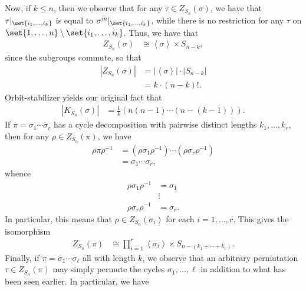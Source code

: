 \documentclass[10pt]{mypackage}
\begin{document}
Now, if $k\leq n$, then we observe that for any $\tau\in Z_{S_n}\left( \sigma \right)$, we have that $\tau|_{\set{i_1,\dots,i_k}}$ is equal to $\sigma^{m}|_{\set{i_1,\dots,i_k}}$, while there is no restriction for any $\tau$ on $\set{1,\dots,n}\setminus \set{i_1,\dots,i_k}$. Thus, we have that
\begin{align*}
  Z_{S_n}\left( \sigma \right) &\cong \left\langle \sigma \right\rangle\times S_{n-k},
\end{align*}
since the subgroups commute, so that
\begin{align*}
  \left\vert Z_{S_n}\left( \sigma \right) \right\vert &= \left\vert \left\langle \sigma \right\rangle \right\vert\cdot \left\vert S_{n-k} \right\vert\\
                                                      &= k\cdot \left( n-k \right)!.
\end{align*}
Orbit-stabilizer yields our original fact that
\begin{align*}
  \left\vert K_{S_n}\left( \sigma \right) \right\vert &= \frac{1}{k}\left( n\left( n-1 \right)\cdots \left( n-\left( k-1 \right) \right) \right).
\end{align*}
If $\pi = \sigma_1\cdots \sigma_r$ has a cycle decomposition with pairwise distinct lengths $k_1,\dots,k_r$, then for any $\rho \in Z_{S_n}\left( \pi \right)$, we have
\begin{align*}
  \rho \pi \rho^{-1} &= \left( \rho \sigma_1\rho^{-1} \right) \cdots \left( \rho\sigma_r\rho^{-1} \right)\\
                     &= \sigma_1\cdots \sigma_r,
\end{align*}
whence
\begin{align*}
  \rho\sigma_1\rho^{-1} &= \sigma_1\\
                        &\vdots\\
  \rho\sigma_r\rho^{-1} &= \sigma_r.
\end{align*}
In particular, this means that $\rho\in Z_{S_n}\left( \sigma_i \right)$ for each $i=1,\dots,r$. This gives the isomorphism
\begin{align*}
  Z_{S_n}\left( \pi \right) &\cong \prod_{i=1}^{r} \left\langle \sigma_i \right\rangle\times S_{n-\left( k_1+\cdots+k_r \right)}.
\end{align*}
Finally, if $\pi = \sigma_1\cdots \sigma_\ell$ all with length $k$, we observe that an arbitrary permutation $\tau\in Z_{S_n}\left( \pi \right)$ may simply permute the cycles $\sigma_1,\dots,\ell$ in addition to what has been seen earlier. In particular, we have
\end{document}
